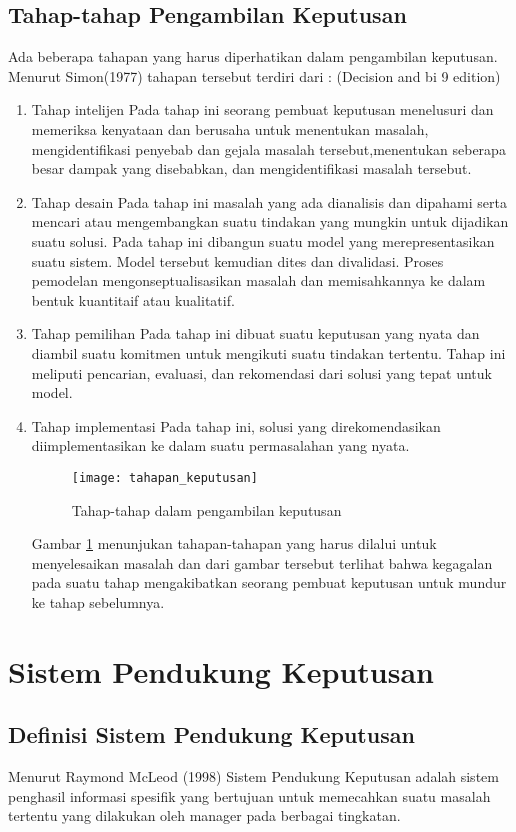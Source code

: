 \subsection{Tahap-tahap Pengambilan Keputusan}
Ada beberapa tahapan yang harus diperhatikan dalam pengambilan keputusan. Menurut Simon(1977) tahapan tersebut terdiri dari : (Decision and bi 9 edition)
\begin{enumerate}
	\item Tahap intelijen
Pada tahap ini seorang pembuat keputusan menelusuri dan memeriksa kenyataan dan berusaha untuk menentukan masalah, mengidentifikasi penyebab dan gejala masalah tersebut,menentukan seberapa besar dampak yang disebabkan, dan mengidentifikasi masalah tersebut.
	\item Tahap desain
Pada tahap ini masalah yang ada dianalisis dan dipahami serta mencari atau mengembangkan suatu tindakan yang mungkin untuk dijadikan suatu solusi. Pada tahap ini dibangun suatu model yang merepresentasikan suatu sistem. Model tersebut kemudian dites dan divalidasi. Proses pemodelan mengonseptualisasikan masalah dan memisahkannya ke dalam bentuk kuantitaif atau kualitatif.
	\item Tahap pemilihan
Pada tahap ini dibuat suatu keputusan yang nyata dan diambil suatu komitmen untuk mengikuti suatu tindakan tertentu. Tahap ini meliputi pencarian, evaluasi, dan rekomendasi dari solusi yang tepat untuk model.
	\item Tahap implementasi
Pada tahap ini, solusi yang direkomendasikan diimplementasikan ke dalam suatu permasalahan yang nyata.

\begin{figure}[H]
	\centering  
	\texttt{[image: tahapan\_keputusan]}  
	\caption[Tahap-tahap dalam pengambilan keputusan]{Tahap-tahap dalam pengambilan keputusan} 
	\label{fig:tahapan_keputusan} 
\end{figure} 

Gambar \ref{fig:tahapan_keputusan} menunjukan tahapan-tahapan yang harus dilalui untuk menyelesaikan masalah dan dari gambar tersebut terlihat bahwa kegagalan pada suatu tahap mengakibatkan seorang pembuat keputusan untuk mundur ke tahap sebelumnya.
	
\end{enumerate}

\section{Sistem Pendukung Keputusan}
\subsection{Definisi Sistem Pendukung Keputusan} 
Menurut Raymond McLeod (1998) Sistem Pendukung Keputusan adalah sistem penghasil informasi spesifik yang bertujuan untuk memecahkan suatu masalah tertentu yang dilakukan oleh manager pada berbagai tingkatan. 

